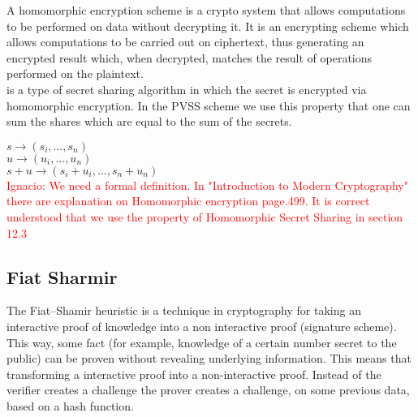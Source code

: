\noindent 
A homomorphic encryption scheme is a crypto system that allows computations to be performed on data without decrypting it. It is an encrypting scheme which allows computations to be carried out on ciphertext, thus generating an encrypted result which, when decrypted, matches the result of operations performed on the plaintext.\\

 is a type of secret sharing algorithm in which the secret is encrypted via homomorphic encryption. In the PVSS scheme we use this property that one can sum the shares which are equal to the sum of the secrets.

\begin{defi}
\begin{math}s\rightarrow (s_i,...,s_n)\end{math}\\
\begin{math}u\rightarrow (u_i,...,u_n) \end{math}\\
\begin{math}s+u\rightarrow (s_i+u_i,...,s_n+u_n) \end{math}\\
\textcolor{red}{Ignacio: We need a formal definition. In "Introduction to Modern Cryptography" there are explanation on Homomorphic encryption page.499. It is correct understood that we use the property of Homomorphic Secret Sharing in section 12.3 }
\end{defi}


\subsection{Fiat Sharmir}
The Fiat–Shamir heuristic is a technique in cryptography for taking an interactive proof of knowledge into a non interactive proof (signature scheme). This way, some fact (for example, knowledge of a certain number secret to the public) can be proven without revealing underlying information. This means that transforming a interactive proof into a non-interactive proof. Instead of the verifier creates a challenge the prover creates a challenge, on some previous data, based on a hash function.

